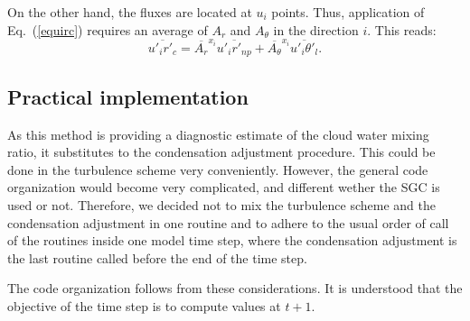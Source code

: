 On the other hand, the fluxes are located at $u_i$ points. Thus,
application of Eq.~(\ref{equirc}) requires an average of
$A_{r}$ and $A_{\theta}$ in the direction $i$.
This reads:
\begin{equation}
\overline{{u'_{i}}{r'_{c}}} = {\overline{A_{r}}}^{x_{i}} \overline{{u'_{i}}{r'_{np}}} +
{\overline{A_{\theta}}}^{x_{i}} \overline{{u'_{i}}{{\theta}'_{l}}}.
\end{equation}



\subsection{Practical implementation}


As this method is providing a diagnostic estimate of
the cloud water mixing ratio,
it substitutes to the condensation adjustment procedure.  This could be done in
the turbulence scheme very conveniently.  However, the general code organization
would become very complicated, and different wether the SGC is used or not.
Therefore, we decided not to mix the turbulence scheme and the condensation
adjustment in one routine and to adhere to the usual order
of call of the routines inside one model time step,
where the condensation adjustment
is the last routine called before the end of the time step.

The code organization follows from these considerations. It is understood
that the objective of the time step is to compute values at $t+1$.

